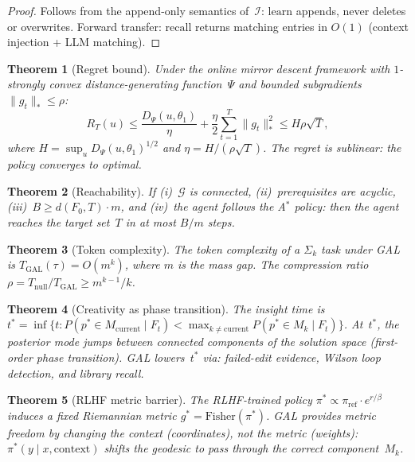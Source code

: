 \documentclass{article}
\newtheorem{theorem}{Theorem}
\newcommand{\calG}{\mathcal{G}}
\newcommand{\calI}{\mathcal{I}}
\begin{document}
\begin{proof}
Follows from the append-only semantics of~$\calI$:
$\mathrm{learn}$ appends, never deletes or overwrites.
Forward transfer: $\mathrm{recall}$ returns matching
entries in $O(1)$ (context injection + LLM matching).
\end{proof}

\begin{theorem}[Regret bound]\label{thm:regret}
Under the online mirror descent framework with
$1$-strongly convex distance-generating function~$\Psi$
and bounded subgradients $\|g_t\|_* \leq \rho$:
\begin{equation}\label{eq:regret}
  R_T(u) \leq \frac{D_\Psi(u, \theta_1)}{\eta}
  + \frac{\eta}{2}\sum_{t=1}^T \|g_t\|_*^2
  \leq H\rho\sqrt{T},
\end{equation}
where $H = \sup_u D_\Psi(u, \theta_1)^{1/2}$ and
$\eta = H/(\rho\sqrt{T})$.
The regret is sublinear: the policy converges to optimal.
\end{theorem}

\begin{theorem}[Reachability]\label{thm:reachability}
If (i)~$\calG$ is connected, (ii)~prerequisites are acyclic,
(iii)~$B \geq d(F_0, T) \cdot m$, and (iv)~the agent follows
the A$^*$ policy: then the agent reaches the target set~$T$
in at most $B/m$ steps.
\end{theorem}

\begin{theorem}[Token complexity]\label{thm:token-complexity}
The token complexity of a $\Sigma_k$ task under GAL is
$T_{\mathrm{GAL}}(\tau) = O(m^k)$, where $m$ is the mass gap.
The compression ratio
$\rho = T_{\mathrm{null}} / T_{\mathrm{GAL}} \geq m^{k-1}/k$.
\end{theorem}

\begin{theorem}[Creativity as phase transition]%
\label{thm:creativity}
The insight time is
$t^* = \inf\{t : P(p^* \in M_{\mathrm{current}} \mid F_t)
< \max_{k \neq \mathrm{current}} P(p^* \in M_k \mid F_t)\}$.
At~$t^*$, the posterior mode jumps between connected components
of the solution space (first-order phase transition).
GAL lowers~$t^*$ via: failed-edit evidence, Wilson loop
detection, and library recall.
\end{theorem}

\begin{theorem}[RLHF metric barrier]\label{thm:rlhf}
The RLHF-trained policy $\pi^* \propto \pi_{\mathrm{ref}}
\cdot e^{r/\beta}$ induces a fixed Riemannian metric
$g^* = \mathrm{Fisher}(\pi^*)$.
GAL provides metric freedom by changing the context
(coordinates), not the metric (weights):
$\pi^*(y \mid x, \mathrm{context})$ shifts the geodesic
to pass through the correct component~$M_k$.
\end{theorem}
\end{document}
